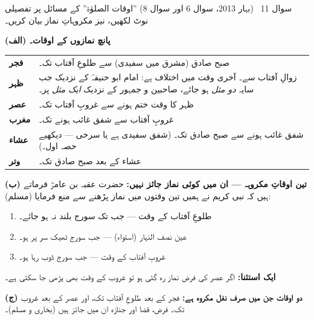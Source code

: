 \begin{sawal}{سوال \textenglish{11} \ \textnormal{\small(بہار \textenglish{2013}، سوال \textenglish{6} اور سوال \textenglish{8})}}
''اوقات الصلوٰۃ'' کے مسائل پر تفصیلی نوٹ لکھیں، نیز مکروہاتِ نماز بیان کریں۔
\end{sawal}

\begin{hal}
\textbf{(الف) پانچ نمازوں کے اوقات۔}

\begin{center}
\begin{tabular}{@{}p{2.4cm} p{12.0cm}@{}}
\toprule
\textbf{فجر}   & صبح صادق (مشرق میں سفیدی) سے طلوعِ آفتاب تک۔ \\
\textbf{ظہر}   & زوالِ آفتاب سے۔ آخری وقت میں اختلاف ہے: امام ابو حنیفہؒ کے
                 نزدیک جب سایہ \emph{دو مثل} ہو جائے، صاحبین و جمہور کے نزدیک
                 \emph{ایک مثل} پر۔ \\
\textbf{عصر}   & ظہر کا وقت ختم ہونے سے غروبِ آفتاب تک۔ \\
\textbf{مغرب}  & غروبِ آفتاب سے شفق غائب ہونے تک۔ \\
\textbf{عشاء}  & شفق غائب ہونے سے صبح صادق تک۔ (شفق سفیدی ہے یا سرخی --- دیکھیے
                 حصہ اول۔) \\
\textbf{وتر}   & عشاء کے بعد صبح صادق تک۔ \\
\bottomrule
\end{tabular}
\end{center}

\medskip
\textbf{(ب) تین اوقاتِ مکروہہ --- ان میں کوئی نماز جائز نہیں:} حضرت عقبہ بن
عامرؓ فرماتے ہیں کہ نبی کریم \saw نے ہمیں تین وقتوں میں نماز پڑھنے سے منع فرمایا
(مسلم):

\begin{enumerate}\setlength{\itemsep}{1pt}
  \item طلوعِ آفتاب کے وقت --- جب تک سورج بلند نہ ہو جائے۔
  \item عین نصف النہار (استواء) --- جب سورج ٹھیک سر پر ہو۔
  \item غروبِ آفتاب کے وقت --- جب سورج ڈوب رہا ہو۔
\end{enumerate}

\smallskip
\textbf{ایک استثنا:} اگر عصر کی فرض نماز رہ گئی ہو تو غروب کے وقت بھی پڑھی جا
سکتی ہے۔

\medskip
\textbf{(ج) دو اوقات جن میں صرف نفل مکروہ ہے:} فجر کے بعد طلوعِ آفتاب تک، اور
عصر کے بعد غروب تک۔ فرض، قضا اور جنازہ ان میں جائز ہیں (بخاری و مسلم)۔


\end{hal}
